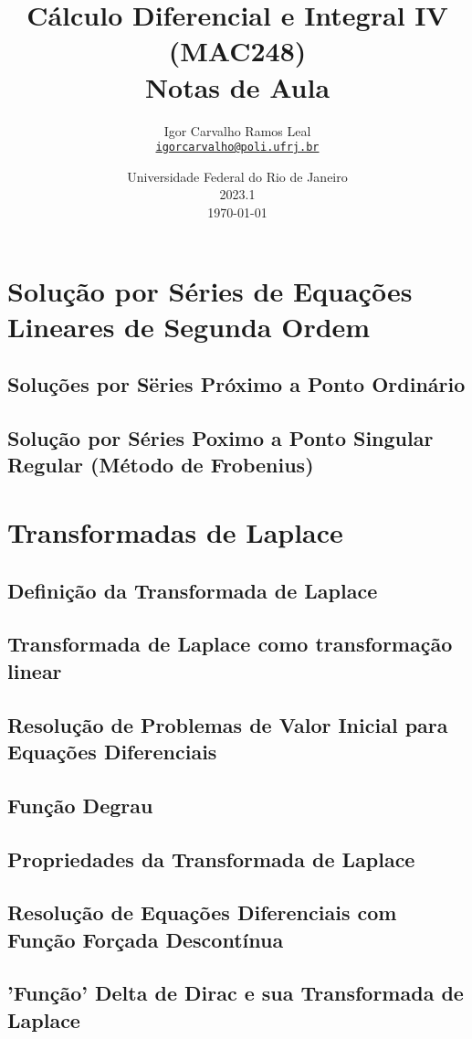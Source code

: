 \documentclass{article}
\title{Cálculo Diferencial e Integral IV (MAC248)\\Notas de Aula}
\author{Igor Carvalho Ramos Leal\\\href{mailto:igorcarvalho@poli.ufrj.br}{\texttt{igorcarvalho@poli.ufrj.br}}}
\date{Universidade Federal do Rio de Janeiro\\2023.1\\\today}
\begin{document}
\maketitle
\tableofcontents



\section{Solução por Séries de Equações Lineares de Segunda Ordem}
\subsection{Soluções por Sëries Próximo a Ponto Ordinário}
\subsection{Solução por Séries Poximo a Ponto Singular Regular (Método de Frobenius)}

\section{Transformadas de Laplace}

\subsection{Definição da Transformada de Laplace}
\subsection{Transformada de Laplace como transformação linear}
\subsection{Resolução de Problemas de Valor Inicial para Equações Diferenciais}
\subsection{Função Degrau}
\subsection{Propriedades da Transformada de Laplace}
\subsection{Resolução de Equações Diferenciais com Função Forçada Descontínua}
\subsection{'Função' Delta de Dirac e sua Transformada de Laplace}
\end{document}
